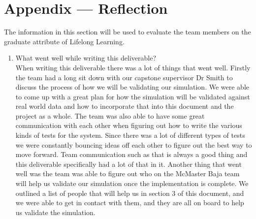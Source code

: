 \documentclass[12pt, titlepage]{article}
\begin{document}
\newpage{}
\section*{Appendix --- Reflection}

The information in this section will be used to evaluate the team members on the
graduate attribute of Lifelong Learning.



\begin{enumerate}
  \item What went well while writing this deliverable?\\ 
  When writing this deliverable there was a lot of things that went well.
  Firstly the team had a long sit down with our capstone supervisor Dr Smith to discuss the process of how we will be validating our simulation.
  We were able to come up with a great plan for how the simulation will be validated against real world data and how to incorporate that into this document and the project as a whole.
  The team was also able to have some great communication with each other when figuring out how to write the various kinds of tests for the system.
  Since there was a lot of different types of tests we were constantly bouncing ideas off each other to figure out the best way to move forward.
  Team communication such as that is always a good thing and this deliverable specifically had a lot of that in it.
  Another thing that went well was the team was able to figure out who on the McMaster Baja team will help us validate our simulation once the implementation is complete.
  We outlined a list of people that will help us in section 3 of this document, and we were able to get in contact with them, and they are all on board to help us validate the simulation.  


\end{enumerate}
\end{document}
